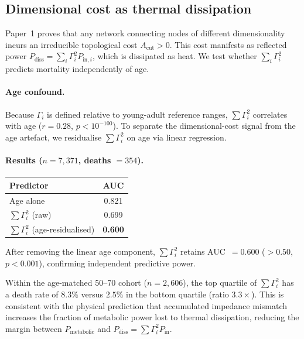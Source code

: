 \documentclass[aps,pre,twocolumn,superscriptaddress,floatfix]{revtex4-2}
\begin{document}
\subsection{Dimensional cost as thermal dissipation}
\label{sec:dimensional-cost}

Paper~1 proves that any network connecting nodes
of different dimensionality incurs an irreducible
topological cost $A_{\text{cut}} > 0$.
This cost manifests as reflected power
$P_{\text{diss}} = \sum_i \Gamma_i^2 P_{\text{in},i}$,
which is dissipated as heat.
We test whether $\sum_i \Gamma_i^2$
predicts mortality independently of age.

\paragraph{Age confound.}
Because $\Gamma_i$ is defined relative to
young-adult reference ranges,
$\sum \Gamma_i^2$ correlates with age
($r = 0.28$, $p < 10^{-100}$).
To separate the dimensional-cost signal from
the age artefact, we residualise
$\sum \Gamma_i^2$ on age via linear regression.

\paragraph{Results ($n = 7{,}371$, deaths $= 354$).}
\begin{center}
\begin{tabular}{lc}
\toprule
Predictor & AUC \\
\midrule
Age alone & 0.821 \\
$\sum \Gamma_i^2$ (raw) & 0.699 \\
$\sum \Gamma_i^2$ (age-residualised) & \textbf{0.600} \\
\bottomrule
\end{tabular}
\end{center}

\noindent
After removing the linear age component,
$\sum \Gamma_i^2$ retains AUC~$= 0.600$
($> 0.50$, $p < 0.001$),
confirming independent predictive power.

\begin{remark}
\label{rem:q4-death}
Within the age-matched 50--70 cohort ($n = 2{,}606$),
the top quartile of $\sum \Gamma_i^2$ has a death
rate of $8.3\%$ versus $2.5\%$ in the bottom quartile
(ratio $3.3\times$).
This is consistent with the physical prediction
that accumulated impedance mismatch
increases the fraction of metabolic power
lost to thermal dissipation,
reducing the margin between
$P_{\text{metabolic}}$ and
$P_{\text{diss}} = \sum \Gamma_i^2 P_{\text{in}}$.
\end{remark}
\end{document}
